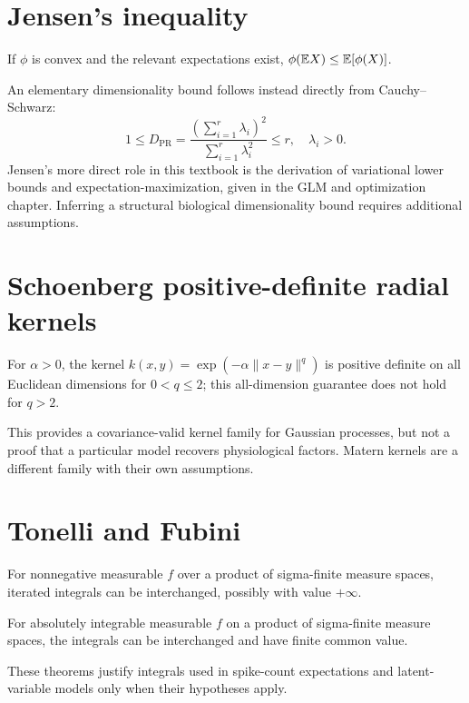 \section{Jensen's inequality}
\begin{theorem}
If $\phi$ is convex and the relevant expectations exist,
$\phi(\mathbb{E} X)\leq\mathbb{E}[\phi(X)]$.
\end{theorem}
An elementary dimensionality bound follows instead directly from
Cauchy--Schwarz:
\[
1\leq D_{\mathrm{PR}}=
\frac{(\sum_{i=1}^r\lambda_i)^2}{\sum_{i=1}^r\lambda_i^2}\leq r,
\quad \lambda_i>0.
\]
Jensen's more direct role in this textbook is the derivation of
variational lower bounds and expectation-maximization, given in the
GLM and optimization chapter. Inferring a structural biological
dimensionality bound requires additional assumptions.

\section{Schoenberg positive-definite radial kernels}
\begin{theorem}
For $\alpha>0$, the kernel
$k(x,y)=\exp(-\alpha\|x-y\|^q)$
is positive definite on all Euclidean dimensions for
$0<q\leq2$; this all-dimension guarantee does not hold
for $q>2$.
\end{theorem}
This provides a covariance-valid kernel family for Gaussian processes,
but not a proof that a particular model recovers physiological factors.
Matern kernels are a different family with their own assumptions.

\section{Tonelli and Fubini}
\begin{theorem}[Tonelli]
For nonnegative measurable $f$ over a product of sigma-finite measure
spaces, iterated integrals can be interchanged, possibly with value
$+\infty$.
\end{theorem}
\begin{theorem}[Fubini]
For absolutely integrable measurable $f$ on a product of
sigma-finite measure spaces, the integrals can be interchanged
and have finite common value.
\end{theorem}
These theorems justify integrals used in spike-count expectations and
latent-variable models only when their hypotheses apply.
